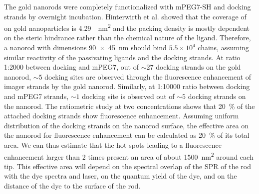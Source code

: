 The gold nanorods were completely functionalized with mPEG7-SH and docking strands by overnight incubation.
Hinterwirth et al. showed that the coverage of  on gold nanoparticles is \SI{4.29}{\per\nm\squared} and the packing density is mostly dependent on the steric hindrance rather than the chemical nature of the ligand.\cite{hinterwirth2013quantifying}
Therefore, a nanorod with dimensions \SI[product-units=repeat]{90x45}{\nm} should bind $5.5\times10^4$ chains, assuming similar reactivity of the passivating ligands and the docking strands.
At ratio 1:2000 between docking and mPEG7, out of ${\sim}27$ docking strands on the gold nanorod, ${\sim}5$ docking sites are observed through the fluorescence enhancement of imager strands by the gold nanorod.
Similarly, at 1:10000 ratio between docking and mPEG7 strands, ${\sim}1$ docking site is observed out of ${\sim}5$ docking strands on the nanorod.
The ratiometric study at two concentrations shows that \SI{20}{\percent} of the attached docking strands show fluorescence enhancement.
Assuming uniform distribution of the docking strands on the nanorod surface, the effective area on the nanorod for fluorescence enhancement can be calculated as \SI{20}{\percent} of its total area. We can thus estimate that the hot spots leading to a fluorescence enhancement larger than 2 times present an area of about \SI{1500}{\nm\squared} around each tip. This effective area will depend on the spectral overlap of the SPR of the rod with the dye spectra and laser, on the quantum yield of the dye, and on the distance of the dye to the surface of the rod.


